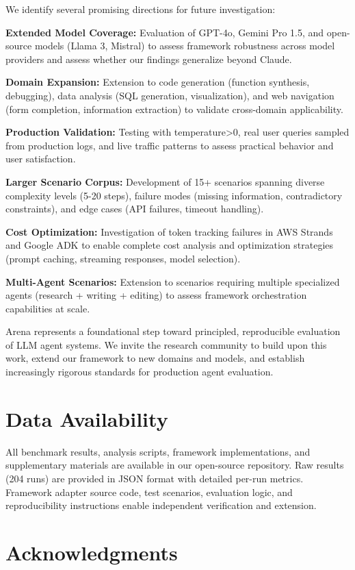 \documentclass[sigconf,nonacm]{acmart}
\begin{document}
We identify several promising directions for future investigation:

\textbf{Extended Model Coverage:} Evaluation of GPT-4o, Gemini Pro 1.5, and open-source models (Llama 3, Mistral) to assess framework robustness across model providers and assess whether our findings generalize beyond Claude.

\textbf{Domain Expansion:} Extension to code generation (function synthesis, debugging), data analysis (SQL generation, visualization), and web navigation (form completion, information extraction) to validate cross-domain applicability.

\textbf{Production Validation:} Testing with temperature>0, real user queries sampled from production logs, and live traffic patterns to assess practical behavior and user satisfaction.

\textbf{Larger Scenario Corpus:} Development of 15+ scenarios spanning diverse complexity levels (5-20 steps), failure modes (missing information, contradictory constraints), and edge cases (API failures, timeout handling).

\textbf{Cost Optimization:} Investigation of token tracking failures in AWS Strands and Google ADK to enable complete cost analysis and optimization strategies (prompt caching, streaming responses, model selection).

\textbf{Multi-Agent Scenarios:} Extension to scenarios requiring multiple specialized agents (research + writing + editing) to assess framework orchestration capabilities at scale.

Arena represents a foundational step toward principled, reproducible evaluation of LLM agent systems. We invite the research community to build upon this work, extend our framework to new domains and models, and establish increasingly rigorous standards for production agent evaluation.

\section{Data Availability}

All benchmark results, analysis scripts, framework implementations, and supplementary materials are available in our open-source repository. Raw results (204 runs) are provided in JSON format with detailed per-run metrics. Framework adapter source code, test scenarios, evaluation logic, and reproducibility instructions enable independent verification and extension.

\section{Acknowledgments}
\end{document}
